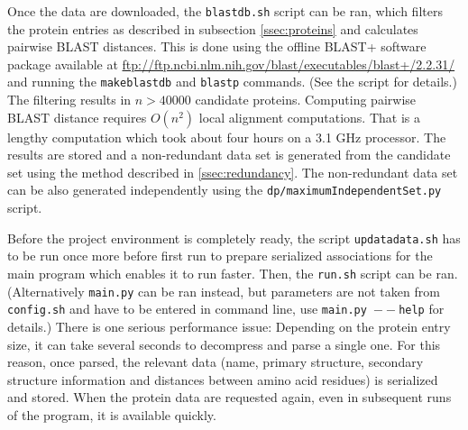 \documentclass[11pt,twoside,a4paper]{book}
\begin{document}
Once the data are downloaded, the \texttt{blastdb.sh} script can be ran,
which filters the protein entries as described in subsection \ref{ssec:proteins}
and calculates pairwise BLAST distances. 
This is done using the offline BLAST+ software package
available at \url{ftp://ftp.ncbi.nlm.nih.gov/blast/executables/blast+/2.2.31/}
and running the \texttt{makeblastdb} and \texttt{blastp} commands. 
(See the script for details.)
The filtering results in $n > 40000$ candidate proteins.
Computing pairwise BLAST distance requires $O(n^2)$ local alignment computations.
That is a lengthy computation which took about four hours on a 3.1 GHz processor.
The results are stored and a non-redundant data set 
is generated from the candidate set using the method described in \ref{ssec:redundancy}.
The non-redundant data set can be also generated independently using the 
\texttt{dp/maximumIndependentSet.py} script.

Before the project environment is completely ready,
the script \texttt{updatadata.sh} has to be run once more before first run to prepare
serialized associations for the main program which enables it to run faster.
Then, the \texttt{run.sh} script can be ran.
(Alternatively \texttt{main.py} can be ran instead, but parameters
are not taken from \texttt{config.sh} and have to be entered in command line,
use \texttt{main.py $--$help} for details.)
There is one serious performance issue:
Depending on the protein entry size,
it can take several seconds to decompress and parse a single one.
For this reason, once parsed, the relevant data
(name, primary structure, secondary structure information and distances
between amino acid residues) is serialized and stored.
When the protein data are requested again, even in subsequent 
runs of the program, it is available quickly.
\end{document}
